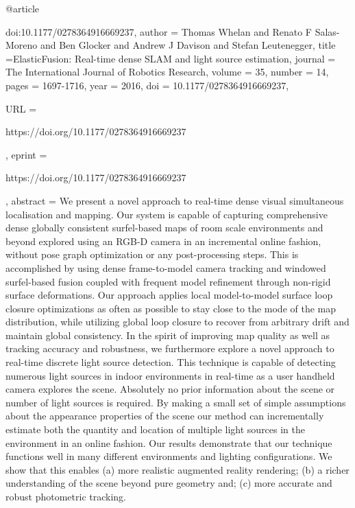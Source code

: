 @article{doi:10.1177/0278364916669237,
author = {Thomas Whelan and Renato F Salas-Moreno and Ben Glocker and Andrew J Davison and Stefan Leutenegger},
title ={ElasticFusion: Real-time dense SLAM and light source estimation},
journal = {The International Journal of Robotics Research},
volume = {35},
number = {14},
pages = {1697-1716},
year = {2016},
doi = {10.1177/0278364916669237},

URL = { 
        https://doi.org/10.1177/0278364916669237
    
},
eprint = { 
        https://doi.org/10.1177/0278364916669237
    
}
,
    abstract = { We present a novel approach to real-time dense visual simultaneous localisation and mapping. Our system is capable of capturing comprehensive dense globally consistent surfel-based maps of room scale environments and beyond explored using an RGB-D camera in an incremental online fashion, without pose graph optimization or any post-processing steps. This is accomplished by using dense frame-to-model camera tracking and windowed surfel-based fusion coupled with frequent model refinement through non-rigid surface deformations. Our approach applies local model-to-model surface loop closure optimizations as often as possible to stay close to the mode of the map distribution, while utilizing global loop closure to recover from arbitrary drift and maintain global consistency. In the spirit of improving map quality as well as tracking accuracy and robustness, we furthermore explore a novel approach to real-time discrete light source detection. This technique is capable of detecting numerous light sources in indoor environments in real-time as a user handheld camera explores the scene. Absolutely no prior information about the scene or number of light sources is required. By making a small set of simple assumptions about the appearance properties of the scene our method can incrementally estimate both the quantity and location of multiple light sources in the environment in an online fashion. Our results demonstrate that our technique functions well in many different environments and lighting configurations. We show that this enables (a) more realistic augmented reality rendering; (b) a richer understanding of the scene beyond pure geometry and; (c) more accurate and robust photometric tracking. }
}